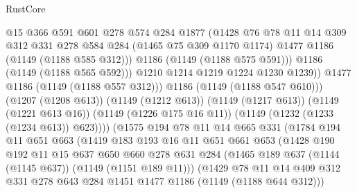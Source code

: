 \begin{lexlean}{RustCore}
\begin{coremodule}
                          @15
                          @366
                          @591
                          @601
                          @278
                          @574
                          @284
                          @1877
                          (@1428
                            @76
                            @78
                            @11
                            @14
                            @309
                            @312
                            @331
                            @278
                            @584
                            @284
                            (@1465 @75 @309 @1170 @1174)
                            @1477
                            @1186
                            (@1149 (@1188 @585 @312)))
                          @1186
                          (@1149 (@1188 @575 @591)))
                        @1186
                        (@1149 (@1188 @565 @592)))
                      @1210
                      @1214
                      @1219
                      @1224
                      @1230
                      @1239))
                  @1477
                  @1186
                  (@1149 (@1188 @557 @312)))
                @1186
                (@1149 (@1188 @547 @610)))
              (@1207 (@1208 @613))
              (@1149 (@1212 @613))
              (@1149 (@1217 @613))
              (@1149 (@1221 @613 @16))
              (@1149 (@1226 @175 @16 @11))
              (@1149 (@1232 (@1233 (@1234 @613)) @623))))
          (@1575
            @194
            @78
            @11
            @14
            @665
            @331
            (@1784
              @194
              @11
              @651
              @663
              (@1419
                @183
                @193
                @16
                @11
                @651
                @661
                @653
                (@1428
                  @190
                  @192
                  @11
                  @15
                  @637
                  @650
                  @660
                  @278
                  @631
                  @284
                  (@1465 @189 @637 (@1144 (@1145 @637)) (@1149 (@1151 @189 @11)))
                  (@1429
                    @78
                    @11
                    @14
                    @409
                    @312
                    @331
                    @278
                    @643
                    @284
                    @1451
                    @1477
                    @1186
                    (@1149 (@1188 @644 @312)))

\end{coremodule}
\end{lexlean}
